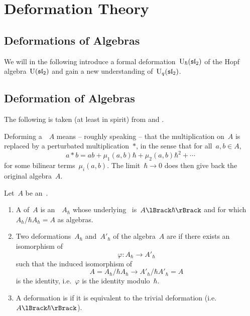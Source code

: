 \documentclass[a4paper, 11pt, oneside]{scrartcl}
\begin{document}
\section{Deformation Theory}
\label{deformation theory}



\subsection{Deformations of Algebras}

We will in the following introduce a formal deformation~$\operatorname{U}_{\hbar}(\mathfrak{sl}_2)$ of the Hopf algebra~$\operatorname{U}(\mathfrak{sl}_2)$ and gain a new understanding of~$\operatorname{U}_q(\mathfrak{sl}_2)$.



\subsection{Deformation of Algebras}

The following is taken (at least in spirit) from \cite[\S 5.2]{pieter_hochschild} and \cite{gerstenhaber_quantum}.

\begin{motivation}
  Deforming a~\algebra{$\kf$}~$A$ means -- roughly speaking -- that the multiplication on~$A$ is replaced by a perturbated multiplication~$*$, in the sense that for all~$a, b \in A$,
  \[
    a * b
    =
    ab + \mu_1(a,b) \hbar + \mu_2(a,b) \hbar^2 + \dotsb
  \]
  for some bilinear terms~$\mu_i(a,b)$.
  The limit~$\hbar \to 0$ does then give back the original algebra~$A$.
\end{motivation}

\begin{definition}
  \label{definition of algebra deformations}
  Let~$A$ be an~\algebra{$\kf$}.
  \begin{enumerate}
    \item
      A  of~$A$ is an~\algebra{$\kfhbar$}~$A_\hbar$ whose underlying~\module{$\kfhbar$} is~$\power{A}{\hbar}$ and for which~$A_\hbar / \hbar A_\hbar = A$ as algebras.
    \item
      Two deformations~$A_\hbar$ and~$A'_\hbar$ of the algebra~$A$ are  if there exists an isomorphism of~\algebras{$\kfhbar$}
      \[
        \varphi
        \colon
        A_\hbar
        \to
        A'_\hbar
      \]
      such that the induced isomorphism of~\algebras{$\kf$}
      \[
        A
        =
        A_\hbar / \hbar A_\hbar
        \to
        A'_\hbar / \hbar A'_\hbar
        = A
      \]
      is the identity, i.e.~$\varphi$ is the identity modulo~$\hbar$.
    \item
      A deformation is  if it is equivalent to the trivial deformation (i.e.~$\power{A}{\hbar}$).
  \end{enumerate}
\end{definition}
\end{document}
